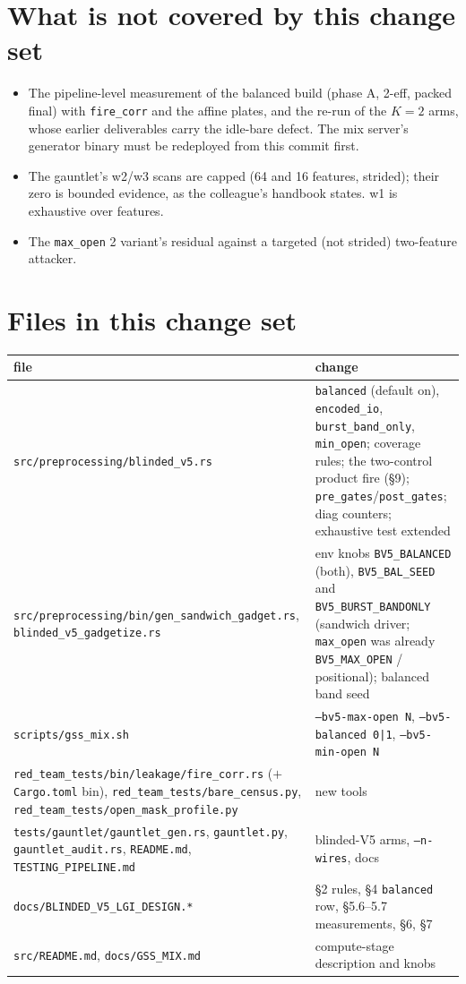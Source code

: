 \documentclass[11pt]{article}
\newcommand{\doc}[1]{\texttt{#1}}
\begin{document}
\section{What is not covered by this change set}
\begin{itemize}
\item The pipeline-level measurement of the balanced build (phase A, 2-eff, packed final)
  with \doc{fire\_corr} and the affine plates, and the re-run of the $K=2$ arms, whose
  earlier deliverables carry the idle-bare defect. The mix server's generator binary must be
  redeployed from this commit first.
\item The gauntlet's w2/w3 scans are capped (64 and 16 features, strided); their zero is
  bounded evidence, as the colleague's handbook states. w1 is exhaustive over features.
\item The \doc{max\_open} 2 variant's residual against a targeted (not strided) two-feature
  attacker.
\end{itemize}

\section{Files in this change set}
\begin{center}\footnotesize
\begin{tabular}{@{}p{5.6cm}p{10.2cm}@{}}\toprule
file & change\\\midrule
\doc{src/preprocessing/blinded\_v5.rs} & \doc{balanced} (default on), \doc{encoded\_io}, \doc{burst\_band\_only}, \doc{min\_open}; coverage rules; the two-control product fire (\S9); \doc{pre\_gates}/\doc{post\_gates}; diag counters; exhaustive test extended\\
\doc{src/preprocessing/bin/}\newline\doc{gen\_sandwich\_gadget.rs}, \doc{blinded\_v5\_gadgetize.rs} & env knobs \doc{BV5\_BALANCED} (both), \doc{BV5\_BAL\_SEED} and \doc{BV5\_BURST\_BANDONLY} (sandwich driver; \doc{max\_open} was already \doc{BV5\_MAX\_OPEN} / positional); balanced band seed\\
\doc{scripts/gss\_mix.sh} & \doc{--bv5-max-open N}, \doc{--bv5-balanced 0|1}, \doc{--bv5-min-open N}\\
\doc{red\_team\_tests/bin/leakage/fire\_corr.rs} ($+$ \doc{Cargo.toml} bin), \doc{red\_team\_tests/bare\_census.py}, \doc{red\_team\_tests/open\_mask\_profile.py} & new tools\\
\doc{tests/gauntlet/}\newline\doc{gauntlet\_gen.rs}, \doc{gauntlet.py}, \doc{gauntlet\_audit.rs}, \doc{README.md}, \doc{TESTING\_PIPELINE.md} & blinded-V5 arms, \doc{--n-wires}, docs\\
\doc{docs/BLINDED\_V5\_LGI\_DESIGN.*} & \S2 rules, \S4 \doc{balanced} row, \S5.6--5.7 measurements, \S6, \S7\\
\doc{src/README.md}, \doc{docs/GSS\_MIX.md} & compute-stage description and knobs\\\bottomrule
\end{tabular}
\end{center}
\end{document}
